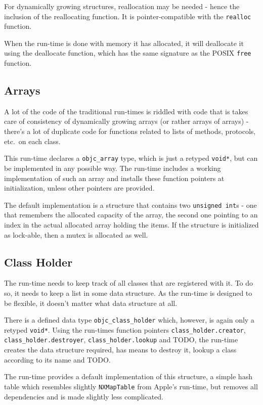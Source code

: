 For dynamically growing structures, reallocation may be needed - hence the inclusion of the reallocating function. It is pointer-compatible with the \verb=realloc= function.

When the run-time is done with memory it has allocated, it will deallocate it using the deallocate function, which has the same signature as the POSIX \verb=free= function.

\subsection{Arrays}

A lot of the code of the traditional run-times is riddled with code that is takes care of consistency of dynamically growing arrays (or rather arrays of arrays) - there's a lot of duplicate code for functions related to lists of methods, protocols, etc.\ on each class.

This run-time declares a \verb=objc_array= type, which is just a retyped \verb=void*=, but can be implemented in any possible way. The run-time includes a working implementation of such an array and installs these function pointers at initialization, unless other pointers are provided.

The default implementation is a structure that contains two \verb=unsigned int=s - one that remembers the allocated capacity of the array, the second one pointing to an index in the actual allocated array holding the items. If the structure is initialized as lock-able, then a mutex is allocated as well.


\subsection{Class Holder}

The run-time needs to keep track of all classes that are registered with it. To do so, it needs to keep a list in some data structure. As the run-time is designed to be flexible, it doesn't matter what data structure at all.

There is a defined data type \verb=objc_class_holder= which, however, is again only a retyped \verb=void*=. Using the run-times function pointers \verb=class_holder.creator=, \verb=class_holder.destroyer=, \verb=class_holder.lookup= and TODO, the run-time creates the data structure required, has means to destroy it, lookup a class according to its name and TODO.

The run-time provides a default implementation of this structure, a simple hash table which resembles slightly \verb=NXMapTable= from Apple's run-time, but removes all dependencies and is made slightly less complicated.

